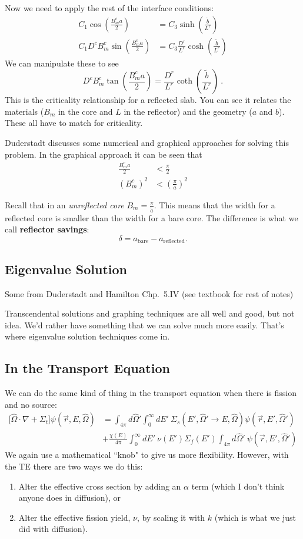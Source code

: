\documentclass[12pt]{article}
\newcommand{\vOmega}{\ensuremath{\hat{\Omega}}}
\begin{document}
Now we need to apply the rest of the interface conditions:
\begin{align*}
C_1 \cos(\frac{B_m^c a}{2}) &= C_3 \sinh(\frac{\tilde{b}}{L^r})\\
C_1 D^c B_m^c \sin(\frac{B_m^c a}{2}) &= C_3 \frac{D^r}{L^r}\cosh(\frac{\tilde{b}}{L^r})
\end{align*}
We can manipulate these to see
\[
D^c B_m^c \tan(\frac{B_m^c a}{2}) = \frac{D^r}{L^r}\coth(\frac{\tilde{b}}{L^r})\:.
\]
This is the criticality relationship for a reflected slab. You can see it relates the materials ($B_m$ in the core and $L$ in the reflector) and the geometry ($a$ and $b$). These all have to match for criticality.

Duderstadt discusses some numerical and graphical approaches for solving this problem. In the graphical approach it can be seen that
\begin{align*}
\frac{B_m^c a}{2} &< \frac{\pi}{2}\\
(B_m^c)^2 &< (\frac{\pi}{a})^2
\end{align*}

Recall that in an \textit{unreflected core} $B_m = \frac{\pi}{\tilde{a}}$. This means that the width for a reflected core is smaller than the width for a bare core. The difference is what we call \textbf{reflector savings}:
\[
\delta = a_{\text{bare}} - a_{\text{reflected}}.
\]

\subsection*{Eigenvalue Solution}
Some from Duderstadt and Hamilton Chp.\ 5.IV (see textbook for rest of notes)

Transcendental solutions and graphing techniques are all well and good, but not idea. We'd rather have something that we can solve much more easily. That's where eigenvalue solution techniques come in. 




\subsection*{In the Transport Equation}
We can do the same kind of thing in the transport equation when there is fission and no source:
\begin{align*}
\bigl[\vOmega \cdot \nabla + \Sigma_t\bigr] \psi(\vec{r}, E, \vOmega) &= \int_{4 \pi} d\vOmega' \int_0^{\infty} dE' \: \Sigma_s(E', \vOmega' \rightarrow E, \vOmega) \psi(\vec{r}, E', \vOmega')\\
 &+ \frac{\chi(E)}{4 \pi}\int_0^{\infty} dE' \: \nu(E') \Sigma_f(E') \int_{4 \pi} d\vOmega' \:\psi(\vec{r}, E', \vOmega')
\end{align*}
%
We again use a mathematical ``knob" to give us more flexibility. However, with the TE there are two ways we do this:
\begin{enumerate}
\item Alter the effective cross section by adding an $\alpha$  term (which I don't think anyone does in diffusion), or
\item Alter the effective fission yield, $\nu$, by scaling it with $k$ (which is what we just did with diffusion).
\end{enumerate}
\end{document}
